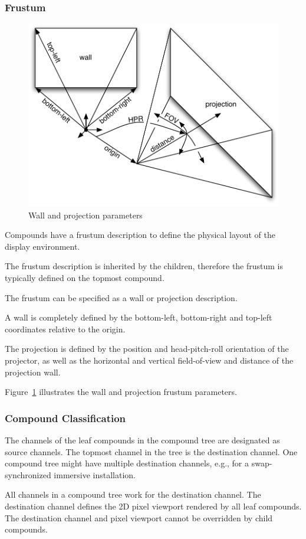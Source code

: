 \documentclass[10pt,a4]{scrartcl}
\newcommand{\fig}[1]{Figure~\ref{#1}}
\begin{document}
\subsubsection{\label{sFrustum}Frustum}
\begin{figure}
  \includegraphics[width=.618\textwidth]{images/frusta.pdf}
  {\caption{\label{fFrusta}Wall and projection parameters}}
\end{figure}
Compounds have a frustum description to define the physical layout of
the display environment. 

The frustum description is inherited by the children, therefore the
frustum is typically defined on the topmost compound. 

The frustum can be specified as a wall or projection description. 

A wall is completely defined by the bottom-left, bottom-right and
top-left coordinates relative to the origin. 

The projection is defined by the position and head-pitch-roll
orientation of the projector, as well as the horizontal and vertical
field-of-view and distance of the projection wall. 

\fig{fFrusta} illustrates the wall and projection frustum parameters.

\subsubsection{Compound Classification}
The channels of the leaf compounds in the compound tree are designated
as source channels. The topmost channel in the tree is the destination
channel. One compound tree might have multiple destination channels,
e.g., for a swap-synchronized immersive installation. 

All channels in a compound tree work for the destination channel. The
destination channel defines the 2D pixel viewport rendered by all leaf
compounds. The destination channel and pixel viewport cannot be
overridden by child compounds.
\end{document}
